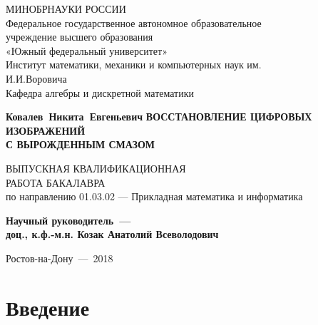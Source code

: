 \documentclass[a4paper]{article}
\renewcommand{\normalsize}{\fontsize{14}{16pt}\selectfont}
\renewcommand{\large}{\fontsize{17}{20pt}\selectfont}
\theoremstyle{definition}
\begin{document}
\normalsize

    \thispagestyle{empty}
    \begin{titlepage}
    \begin{center}


    \vfill
    МИНОБРНАУКИ РОССИИ\\
    \vspace*{0.3cm}
    Федеральное государственное автономное образовательное\\
    учреждение высшего образования\\
    «Южный федеральный университет»\\
    \vspace*{0.3cm}
    Институт математики, механики и компьютерных наук им.\\
    И.И.Воровича\\
    Кафедра алгебры и дискретной математики
    \vfill


    \bigskip


    {\large\bf Ковалев~Никита~Евгеньевич}
    \vfill
    {\large\bf ВОССТАНОВЛЕНИЕ ЦИФРОВЫХ ИЗОБРАЖЕНИЙ\\
               С ВЫРОЖДЕННЫМ СМАЗОМ}

\fontsize{14}{16pt}\selectfont

    \vfill
    ВЫПУСКНАЯ КВАЛИФИКАЦИОННАЯ\\ РАБОТА БАКАЛАВРА\\
    по направлению 01.03.02 — Прикладная математика и информатика
    \vfill

    {\bf Научный руководитель~---\\
         доц., к.ф.-м.н. Козак Анатолий Всеволодович}



    \vfill

    \end{center}

    \bigskip

    \begin{center}
        Ростов-на-Дону~---~2018
    \end{center}

    \end{titlepage}

    \tableofcontents
    \newpage


    \section{Введение}
\end{document}
